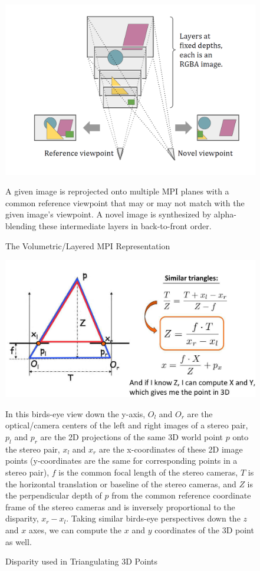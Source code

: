 \begin{figure}[!h]
    \includegraphics[width=1\columnwidth]{figures/mpi-layered-representation.png}
    \caption{The Volumetric/Layered MPI Representation}
    \label{fig:mpi-layered-representation}
    {\small A given image is reprojected onto multiple MPI planes with a common reference viewpoint that may or may not match with the given image's viewpoint. A novel image is synthesized by alpha-blending these intermediate layers in back-to-front order.}
\end{figure}

\begin{figure}[!h]
    \includegraphics[width=1\columnwidth]{figures/disparity-triangulation.png}
    \caption{Disparity used in Triangulating 3D Points~\cite{fidler_depth_2021}}
    \label{fig:disparity-triangulation}
    {\small In this birds-eye view down the y-axis, $O_l$ and $O_r$ are the optical/camera centers of the left and right images of a stereo pair, $p_l$ and $p_r$ are the 2D projections of the same 3D world point $p$ onto the stereo pair, $x_l$ and $x_r$ are the x-coordinates of these 2D image points (y-coordinates are the same for corresponding points in a stereo pair), $f$ is the common focal length of the stereo cameras, $T$ is the horizontal translation or baseline of the stereo cameras, and $Z$ is the perpendicular depth of $p$ from the common reference coordinate frame of the stereo cameras and is inversely proportional to the disparity, $x_r - x_l$. Taking similar birds-eye perspectives down the $z$ and $x$ axes, we can compute the $x$ and $y$ coordinates of the 3D point as well.}
\end{figure}

